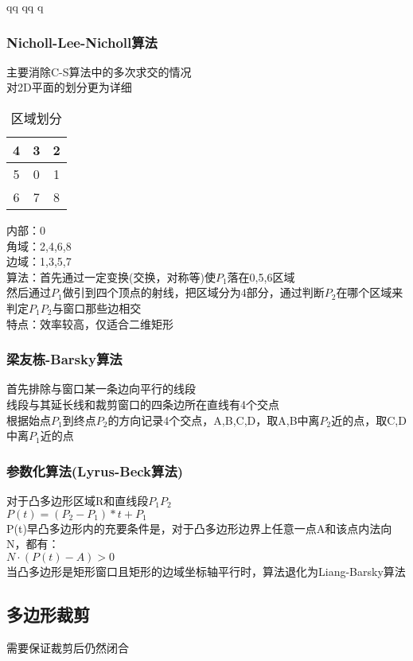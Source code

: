 qq	qq	q                                                                                                                                                                                                                                                                                      \documentclass{article}
\begin{document}
\begin{CJK}{UTF8}{gbsn}
	\subsubsection{Nicholl-Lee-Nicholl算法}
	主要消除C-S算法中的多次求交的情况\\
	对2D平面的划分更为详细\\
	\begin{table}
	\centering
	\caption{区域划分}
	\begin{tabular}{|c|c|c|}
		\hline
		4&3&2\\
		\hline
		5&0&1\\
		\hline
		6&7&8\\
		\hline
	\end{tabular}
	\end{table}
	内部：0\\
	角域：2,4,6,8\\
	边域：1,3,5,7\\
	算法：首先通过一定变换(交换，对称等)使$P_1$落在0,5,6区域\\
	然后通过$P_1$做引到四个顶点的射线，把区域分为4部分，通过判断$P_2$在哪个区域来判定$P_1P_2$与窗口那些边相交\\
	特点：效率较高，仅适合二维矩形\\
	\subsubsection{梁友栋-Barsky算法}
	首先排除与窗口某一条边向平行的线段\\
	线段与其延长线和裁剪窗口的四条边所在直线有4个交点\\
	根据始点$P_1$到终点$P_2$的方向记录4个交点，A,B,C,D，取A,B中离$P_2$近的点，取C,D中离$P_1$近的点\\
	
	\subsubsection{参数化算法(Lyrus-Beck算法)}
	对于凸多边形区域R和直线段$P_1P_2$\\
	$P(t)=(P_2-P_1)*t+P_1$\\
	P(t)早凸多边形内的充要条件是，对于凸多边形边界上任意一点A和该点内法向N，都有：\\
	$N\cdot(P(t)-A)>0$\\
	当凸多边形是矩形窗口且矩形的边域坐标轴平行时，算法退化为Liang-Barsky算法\\
	\subsection{多边形裁剪}
	需要保证裁剪后仍然闭合\\

\end{CJK}
\end{document}
